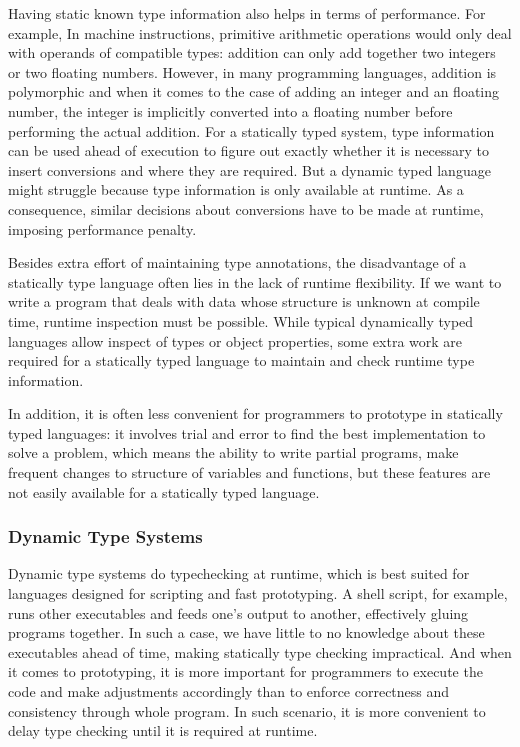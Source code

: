 Having static known type information also helps in terms of performance.
For example, In machine instructions, primitive arithmetic operations
would only deal with operands of compatible types: addition can only add together
two integers or two floating numbers.
However, in many programming languages,
addition is polymorphic and when it comes to the case of adding an integer
and an floating number, the integer is implicitly converted into a floating number before
performing the actual addition.
For a statically typed system, type information can be used ahead of execution
to figure out exactly whether it is necessary to insert conversions
and where they are required.
But a dynamic typed language might struggle because type information
is only available at runtime.
As a consequence, similar decisions about conversions have to be made at runtime,
imposing performance penalty.

Besides extra effort of maintaining type annotations,
the disadvantage of a statically type language often lies in the lack of runtime flexibility.
If we want to write a program that deals with data whose structure is
unknown at compile time, runtime inspection must be possible.
While typical dynamically typed languages allow inspect of types or object properties,
some extra work are required for a statically typed language
to maintain and check runtime type information.

In addition, it is often less convenient for programmers to prototype
in statically typed languages: it involves trial and error to find the best implementation
to solve a problem, which means the ability to write partial programs,
make frequent changes to structure of variables and functions, but these features are not easily available for a statically typed language.

\subsubsection{Dynamic Type Systems}

Dynamic type systems do typechecking at runtime, which is best suited for
languages designed for scripting and fast prototyping.
A shell script, for example, runs other executables and feeds one's output to another,
effectively gluing programs together.
In such a case, we have little to no knowledge about these executables ahead of time,
making statically type checking impractical.
And when it comes to prototyping,
it is more important for programmers to execute the code and make adjustments accordingly
than to enforce correctness and consistency through whole program.
In such scenario, it is more convenient to delay type checking until
it is required at runtime.

